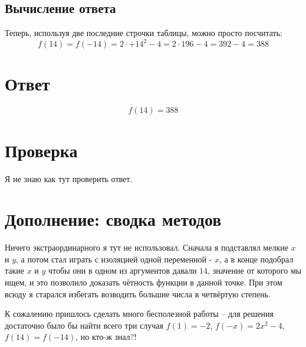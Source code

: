 \documentclass{article}
\begin{document}
\subsection{Вычисление ответа}
Теперь, используя две последние строчки таблицы, можно просто посчитать:
$$f(14)=f(-14)=2\cdot{}{+14}^2-4=2\cdot{}196-4=392-4=388$$

\section{Ответ}
$$f(14)=388$$

\section{Проверка}
Я не знаю как тут проверить ответ.

\section{Дополнение: сводка методов}
Ничего экстраординарного я тут не использовал. Сначала я подставлял мелкие $x$ и $y$, а потом стал играть с изоляцией одной переменной - $x$, а в конце подобрал такие $x$ и $y$ чтобы они в одном из аргументов давали $14$, значение от которого мы ищем, и это позволило доказать чётность функции в данной точке. При этом всюду я старался избегать возводить большие числа в четвёртую степень.

К сожалению пришлось сделать много бесполезной работы -- для решения достаточно было бы найти всего три случая $f(1)=-2$, $f(-x)=2x^2-4$, $f(14)=f(-14)$, но кто-ж знал?!

\end{document}
